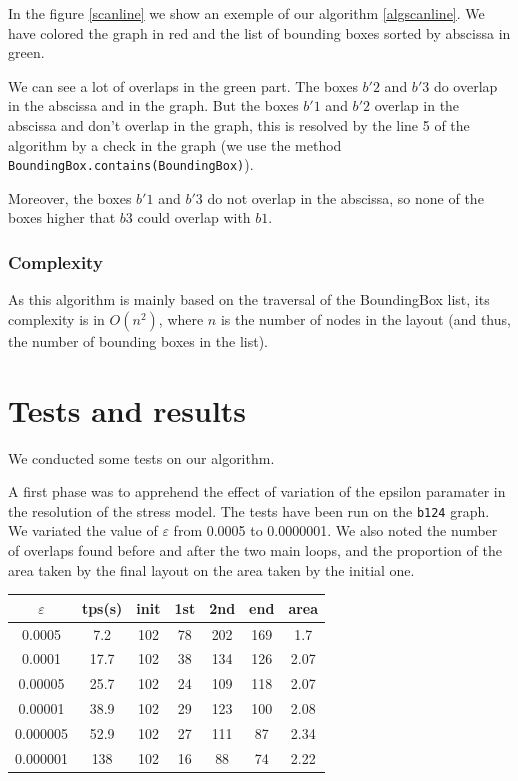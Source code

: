 \documentclass[12pt]{report}
\begin{document}
In the figure \ref{scanline} we show an exemple of our algorithm \ref{algscanline}. We have colored the graph in red and the list of bounding boxes sorted by abscissa in green. 

We can see a lot of overlaps in the green part. The boxes $b'2$ and $b'3$ do overlap in the abscissa and in the graph. But the boxes $b'1$ and $b'2$ overlap in the abscissa and don't overlap in the graph, this is resolved by the line 5 of the algorithm by a check in the graph (we use the method \texttt{BoundingBox.contains(BoundingBox)}).

Moreover, the boxes $b'1$ and $b'3$ do not overlap in the abscissa, so none of the boxes higher that $b3$ could overlap with $b1$.

\subsubsection{Complexity}

As this algorithm is mainly based on the traversal of the BoundingBox list, its complexity is in $O(n^2)$, where $n$ is the number of nodes in the layout (and thus, the number of bounding boxes in the list). 

\section{Tests and results}
We conducted some tests on our algorithm. 

A first phase was to apprehend the effect of variation of the epsilon paramater in the resolution of the stress model.
The tests have been run on the \texttt{b124} graph. We variated the value of $\varepsilon$ from 0.0005 to 0.0000001. We also noted the number of overlaps found before and after the two main loops, and the proportion of the area taken by the final layout on the area taken by the initial one.

\bigskip
\begin{tabular}{|c|c|c|c|c|c|c|}
	\hline 
	 $\varepsilon$ & tps(s) & init & 1st & 2nd & end & area \\
	\hline
	0.0005 & 7.2 & 102 & 78 & 202 & 169 & 1.7\\
	0.0001 & 17.7 & 102 & 38  & 134 & 126 & 2.07\\
	0.00005 & 25.7 & 102 & 24 & 109 & 118 & 2.07\\
	0.00001 & 38.9 & 102 & 29 & 123 & 100 & 2.08\\
	0.000005 & 52.9 & 102 & 27 & 111 & 87 & 2.34\\
	0.000001 & 138 & 102 & 16 & 88 & 74 & 2.22\\
	\hline
\end{tabular}
\end{document}
